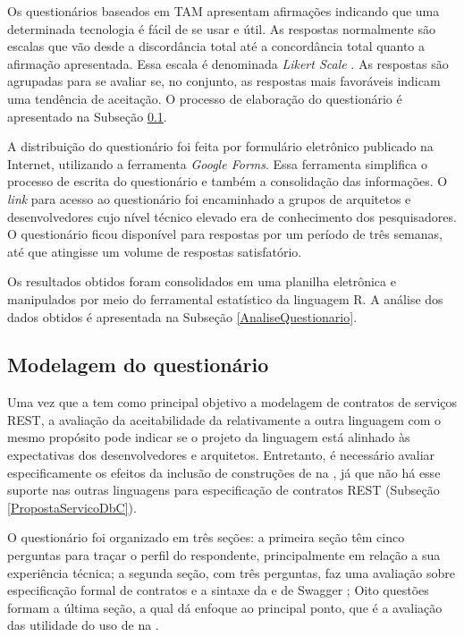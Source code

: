 Os questionários baseados em TAM apresentam afirmações indicando que uma
determinada tecnologia é fácil de se usar e útil. As respostas normalmente são
escalas que vão desde a discordância total até a concordância total quanto a
afirmação apresentada. Essa escala é denominada \textit{Likert Scale}
\cite{allen2007likert}. As respostas são agrupadas para se avaliar se, no
conjunto, as respostas mais favoráveis indicam uma tendência de aceitação. O
processo de elaboração do questionário é apresentado na Subseção \ref{ModelagemQuestionario}.

A distribuição do questionário foi feita por formulário eletrônico publicado na
Internet, utilizando a ferramenta \textit{Google Forms}. Essa ferramenta
simplifica o processo de escrita do questionário e também a consolidação das
informações. O \textit{link} para acesso ao questionário foi encaminhado a
grupos de arquitetos e desenvolvedores cujo nível técnico elevado era de
conhecimento dos pesquisadores. O questionário ficou disponível para respostas
por um período de três semanas, até que atingisse um volume de respostas satisfatório.

Os resultados obtidos foram consolidados em uma planilha eletrônica e
manipulados por meio do ferramental estatístico da linguagem R. A análise dos
dados obtidos é apresentada na Subseção \ref{AnaliseQuestionario}.


\subsection{Modelagem do questionário}
\label{ModelagemQuestionario}

Uma vez que a
\neoidl{} tem como principal objetivo a modelagem de contratos de serviços REST,
a avaliação da aceitabilidade da \neoidl{} relativamente a outra linguagem com o
mesmo propósito pode indicar se o projeto da linguagem está alinhado às
expectativas dos desenvolvedores e arquitetos. Entretanto, é necessário
avaliar especificamente os efeitos da inclusão de construções de
\designbycontract{} na \neoidl{}, já que não há esse suporte nas outras linguagens para especificação
de contratos REST (Subseção \ref{PropostaServicoDbC}).

O questionário foi organizado em três seções: a primeira seção têm cinco
perguntas para traçar o perfil do respondente, principalmente em relação a sua
experiência técnica; a segunda seção, com três perguntas, faz uma avaliação
sobre especificação formal de contratos e a sintaxe da
\neoidl{} e de Swagger \cite{swaggerSite}; 
Oito questões formam a última seção, a qual dá enfoque ao principal ponto, que é
a avaliação das utilidade do uso de \designbycontract{} na \neoidl{}.


